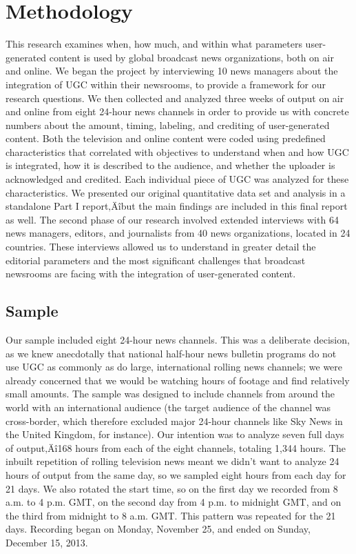 \documentclass[symmetric, notoc, nobib]{towcenter-book}
\begin{document}
\chapter{Methodology}
This research examines when, how much, and within what parameters
user-generated content is used by global broadcast news organizations,
both on air and online. We began the project by interviewing 10 news managers
about the integration of UGC within their newsrooms, to provide
a framework for our research questions. We then collected and analyzed
three weeks of output on air and online from eight 24-hour news channels
in order to provide us with concrete numbers about the amount, timing,
labeling, and crediting of user-generated content. Both the television and
online content were coded using predefined characteristics that correlated
with objectives to understand when and how UGC is integrated, how it is
described to the audience, and whether the uploader is acknowledged and
credited. Each individual piece of UGC was analyzed for these characteristics.
We presented our original quantitative data set and analysis in a standalone
Part I report‚Äîbut the main findings are included in this final report
as well.
The second phase of our research involved extended interviews with 64 news
managers, editors, and journalists from 40 news organizations, located in
24 countries. These interviews allowed us to understand in greater detail
the editorial parameters and the most significant challenges that broadcast
newsrooms are facing with the integration of user-generated content.

\section{Sample}
Our sample included eight 24-hour news channels. This was a deliberate
decision, as we knew anecdotally that national half-hour news bulletin programs
do not use UGC as commonly as do large, international rolling news
channels; we were already concerned that we would be watching hours
of footage and find relatively small amounts. The sample was designed to
include channels from around the world with an international audience (the
target audience of the channel was cross-border, which therefore excluded
major 24-hour channels like Sky News in the United Kingdom, for instance).
Our intention was to analyze seven full days of output‚Äî168 hours from
each of the eight channels, totaling 1,344 hours.
The inbuilt repetition of rolling television news meant we didn't want to
analyze 24 hours of output from the same day, so we sampled eight hours
from each day for 21 days. We also rotated the start time, so on the first day
we recorded from 8 a.m. to 4 p.m. GMT, on the second day from 4 p.m. to
midnight GMT, and on the third from midnight to 8 a.m. GMT. This pattern
was repeated for the 21 days. Recording began on Monday, November
25, and ended on Sunday, December 15, 2013.
\end{document}
